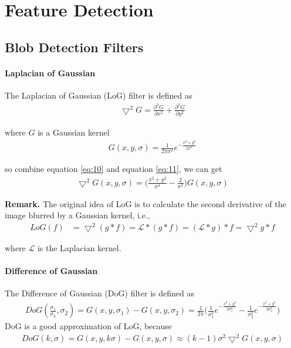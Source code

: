 \documentclass[runningheads]{llncs}
\begin{document}
\section{Feature Detection}
\subsection{Blob Detection Filters}
\paragraph{Laplacian of Gaussian}
The Laplacian of Gaussian (LoG) filter is defined as 
\begin{align}
    \label{eq:10}
    \bigtriangledown^2 G = \frac{\partial^2 G}{\partial x^2} + \frac{\partial^2 G}{\partial y^2}
\end{align}
\par
where $G$ is a Gaussian kernel
\begin{align}
    \label{eq:11}
    G(x, y, \sigma) = \frac{1}{2\pi\sigma^2} e^{-\frac{x^2 + y^2}{2\sigma^2}}
\end{align}
\par
so combine equation \ref{eq:10} and equation \ref{eq:11},
we can get
\begin{align}
    \bigtriangledown^2 G(x, y, \sigma) = \Big( \frac{x^2 + y^2}{\sigma^4} - \frac{2}{\sigma^2} \Big) G(x, y, \sigma)
\end{align}

\noindent\textbf{Remark.}
The original idea of LoG is to calculate the
second derivative of the image blurred by a
Gaussian kernel, i.e.,
\begin{align}
    LoG(f) &= \bigtriangledown^2 (g * f) = \mathcal{L} * (g * f) = (\mathcal{L} * g) * f = \bigtriangledown^2 g * f
\end{align}
\par
where $\mathcal{L}$ is the Laplacian kernel.
\paragraph{Difference of Gaussian}
The Difference of Gaussian (DoG) filter is defined as
\begin{align}
    DoG(\frac{\sigma_1}{\sigma_2},\sigma_2) = G(x, y, \sigma_1) - G(x, y, \sigma_2) =  \frac{1}{2\pi} \Big( \frac{1}{\sigma_1^2} e^{-\frac{x^2 + y^2}{2\sigma_1^2}} - \frac{1}{\sigma_2^2} e^{-\frac{x^2 + y^2}{2\sigma_2^2}} \Big)
\end{align}
DoG is a good approximation of LoG, because
\begin{align}
    DoG(k, \sigma) = G(x, y, k\sigma) - G(x, y, \sigma) \approx (k - 1) \sigma^2 \bigtriangledown^2 G(x, y, \sigma)
\end{align}
\end{document}
